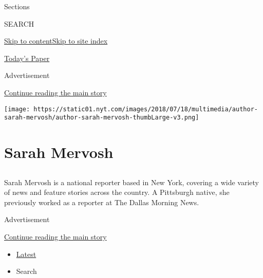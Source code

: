 Sections

SEARCH

\protect\hyperlink{site-content}{Skip to
content}\protect\hyperlink{site-index}{Skip to site index}

\href{https://myaccount.nytimes.com/auth/login?response_type=cookie\&client_id=vi}{}

\href{https://www.nytimes.com/section/todayspaper}{Today's Paper}

Advertisement

\protect\hyperlink{after-top}{Continue reading the main story}

\texttt{[image: https://static01.nyt.com/images/2018/07/18/multimedia/author-sarah-mervosh/author-sarah-mervosh-thumbLarge-v3.png]}

\hypertarget{sarah-mervosh}{%
\section{Sarah Mervosh}\label{sarah-mervosh}}

\subsection{}

Sarah Mervosh is a national reporter based in New York, covering a wide
variety of news and feature stories across the country. A Pittsburgh
native, she previously worked as a reporter at The Dallas Morning News.

Advertisement

\protect\hyperlink{after-mid1}{Continue reading the main story}

\begin{itemize}
\tightlist
\item
  \protect\hyperlink{stream-panel}{Latest}
\item
  Search
\end{itemize}

